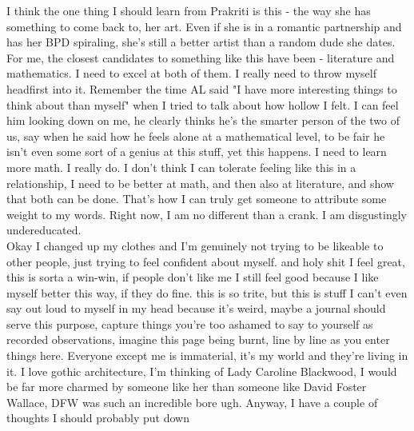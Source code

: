 \noindent {}

I think the one thing I should learn from Prakriti is this - the way she has something to come back to, her art. Even if she is in a romantic partnership and has her BPD spiraling, she's still a better artist than a random dude she dates. For me, the closest candidates to something like this have been - literature and mathematics. I need to excel at both of them. I really need to throw myself headfirst into it. Remember the time AL said "I have more interesting things to think about than myself" when I tried to talk about how hollow I felt. I can feel him looking down on me, he clearly thinks he's the smarter person of the two of us, say when he said how he feels alone at a mathematical level, to be fair he isn't even some sort of a genius at this stuff, yet this happens. I need to learn more math. I really do. I don't think I can tolerate feeling like this in a relationship, I need to be better at math, and then also at literature, and show that both can be done. That's how I can truly get someone to attribute some weight to my words. Right now, I am no different than a crank. I am disgustingly undereducated.\\

Okay I changed up my clothes and I'm genuinely not trying to be likeable to other people, just trying to feel confident about myself. and holy shit I feel great, this is sorta a win-win, if people don't like me I still feel good because I like myself better this way, if they do fine. this is so trite, but this is stuff I can't even say out loud to myself in my head because it's weird, maybe a journal should serve this purpose, capture things you're too ashamed to say to yourself as recorded observations, imagine this page being burnt, line by line as you enter things here. Everyone except me is immaterial, it's my world and they're living in it. I love gothic architecture, I'm thinking of Lady Caroline Blackwood, I would be far more charmed by someone like her than someone like David Foster Wallace, DFW was such an incredible bore ugh. Anyway, I have a couple of thoughts I should probably put down